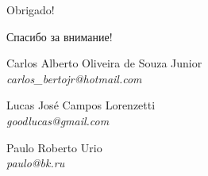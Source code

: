 \documentclass[14pt,beamer]{beamer}
\newcommand\cyrtext[1]{{\fontencoding{T2A}\selectfont #1}}
\begin{document}
\begin{frame}
	\vspace{-15px}
	\begin{center}
		\Huge{Obrigado!}

		\small

		\cyrtext{Спасибо за внимание!}
	\end{center}

	\vspace{15px}
	\small Carlos Alberto Oliveira de Souza Junior \\
	\footnotesize{  \textsl{carlos\_bertojr@hotmail.com} }
	
	\vspace{20px}
	\small Lucas José Campos Lorenzetti \\
	\footnotesize{  \textsl{goodlucas@gmail.com} }
	
	\vspace{20px}
	\small Paulo Roberto Urio \\
	\footnotesize{  \textsl{paulo@bk.ru} }
\end{frame}
\end{document}
